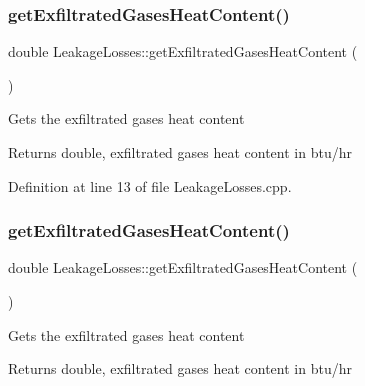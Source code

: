 \subsubsection{\texorpdfstring{get\+Exfiltrated\+Gases\+Heat\+Content()}{getExfiltratedGasesHeatContent()}\hspace{0.1cm}{\footnotesize\ttfamily [2/3]}}
{\footnotesize\ttfamily double Leakage\+Losses\+::get\+Exfiltrated\+Gases\+Heat\+Content (\begin{DoxyParamCaption}{ }\end{DoxyParamCaption})}

Gets the exfiltrated gases heat content

\begin{DoxyReturn}{Returns}
double, exfiltrated gases heat content in btu/hr 
\end{DoxyReturn}


Definition at line 13 of file Leakage\+Losses.\+cpp.

\mbox{\label{class_leakage_losses_a9663b916752bcf39a5482674e225e4a5}} 
\subsubsection{\texorpdfstring{get\+Exfiltrated\+Gases\+Heat\+Content()}{getExfiltratedGasesHeatContent()}\hspace{0.1cm}{\footnotesize\ttfamily [3/3]}}
{\footnotesize\ttfamily double Leakage\+Losses\+::get\+Exfiltrated\+Gases\+Heat\+Content (\begin{DoxyParamCaption}{ }\end{DoxyParamCaption})}

Gets the exfiltrated gases heat content

\begin{DoxyReturn}{Returns}
double, exfiltrated gases heat content in btu/hr 
\end{DoxyReturn}
\mbox{\label{class_leakage_losses_a5dbb249c07bc91611b71d62610af7234}} 

